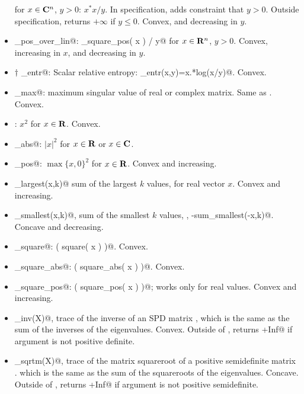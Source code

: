 \documentclass[12pt]{article}
\begin{document}
\begin{itemize}
for $x \in \mathbf{C}^n$, $y>0$: $x^*x/y$.  In \cvx specification,
adds constraint that $y>0$.  Outside \cvx specification,
returns $+\infty$ if $y\leq 0$.
Convex, and decreasing in $y$.
\item \verb@quad_pos_over_lin@: \verb@sum_square_pos( x ) / y@
for $x\in\R^n$, $y>0$.
Convex, increasing in $x$, and decreasing in $y$.
\item $\dagger$ \verb@rel_entr@: Scalar relative entropy: \verb@rel_entr(x,y)=x.*log(x/y)@. Convex.
\item \verb@sigma_max@: maximum singular value of real or 
complex matrix.  Same as \verb@norm@.  Convex.
\item \verb@square@: $x^2$ for $x \in \R$.
Convex.
\item \verb@square_abs@: $|x|^2$ for $x\in\R$ or $x\in\C$.
\item \verb@square_pos@: $\max\{x,0\}^2$ for $x\in\R$.
Convex and increasing.
\item \verb@sum_largest(x,k)@ sum of the largest $k$ values, for
real vector $x$.
Convex and increasing.
\item \verb@sum_smallest(x,k)@, sum of the smallest $k$ values,
\ie, \verb@-sum_smallest(-x,k)@.
Concave and decreasing.
\item \verb@sum_square@: \verb@sum( square( x ) )@. Convex.
\item \verb@sum_square_abs@: \verb@sum( square_abs( x ) )@. Convex.
\item \verb@sum_square_pos@: \verb@sum( square_pos( x ) )@; 
works only for real values. Convex and increasing.

\item \verb@trace_inv(X)@, trace of the inverse of an SPD matrix \verb@X@,
which is the same as the sum of the inverses of the eigenvalues.
Convex. 
Outside of \cvx, returns \verb@+Inf@ if argument is not positive definite.

\item \verb@trace_sqrtm(X)@, trace of the matrix squareroot of a positive
semidefinite matrix 
\verb@X@. which is the same as the sum of the squareroots of the 
eigenvalues.  Concave. 
Outside of \cvx, returns \verb@+Inf@ if argument is not positive semidefinite.
\end{itemize}
\end{document}
